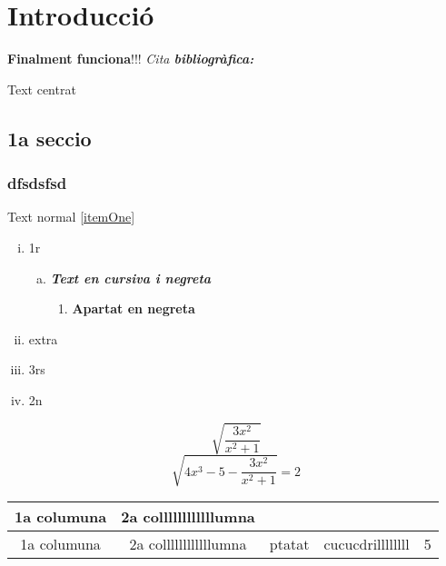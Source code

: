 \chapter{Introducció}

\textbf{Finalment funciona}!!!
\textit{Cita \textbf{bibliogràfica:}} \cite{TP}

\begin{center}
  Text centrat
\end{center}
\section{1a seccio}

\subsection{dfsdsfsd}

Text normal \ref{itemOne}

\begin{enumerate}[i)]
 \item 1r
 \begin{enumerate}[a)]
  \item \textit{\textbf{Text en cursiva i negreta}}
  \begin{enumerate} [1)]
   \item \textbf{Apartat en negreta}
  \end{enumerate}

 \end{enumerate}
 \item extra
 \item\label{itemOne} 3rs
 \item 2n
\end{enumerate}

$$\sqrt{\frac{3x^2}{x^2 +1}}$$
$$\sqrt{{4x^3 -5} - \frac{3x^2}{x^2 +1}} = 2$$



\vspace*{4.3truecm}


\begin{tabular}{|c|c|c|l|r|}
 \hline 1a columuna & 2a collllllllllllumna &  & & \\ \hline
 1a columuna & 2a collllllllllllumna & ptatat & cucucdrillllllll & 5 \\ \hline

\end{tabular}
